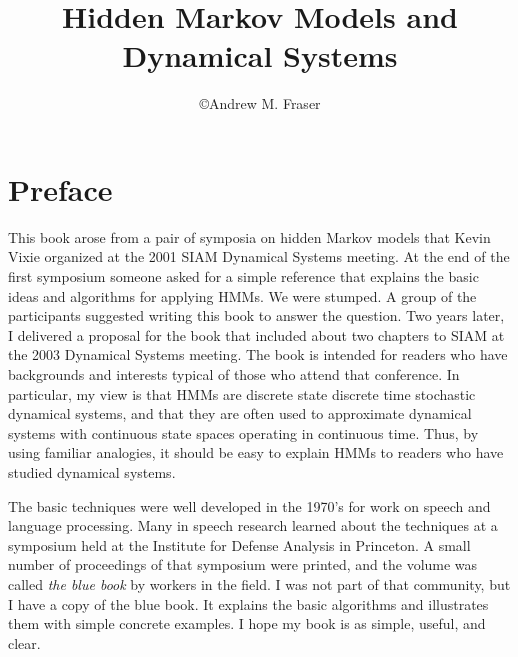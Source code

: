 \documentclass[dvips]{hmmdsbook}
\author{\copyright Andrew M. Fraser}
\title{Hidden Markov Models and Dynamical Systems}
\begin{document}
\frontmatter
\maketitle

\chapter*{Preface}
\label{chap:preface}
This book arose from a pair of symposia on hidden Markov models that
Kevin Vixie organized at the 2001 SIAM Dynamical Systems meeting.  At
the end of the first symposium someone asked for a simple reference
that explains the basic ideas and algorithms for applying HMMs.  We
were stumped.  A group of the participants suggested writing this book
to answer the question.  Two years later, I delivered a proposal for
the book that included about two chapters to SIAM at the 2003
Dynamical Systems meeting.  The book is intended for readers who have
backgrounds and interests typical of those who attend that conference.
In particular, my view is that HMMs are discrete state discrete time
stochastic dynamical systems, and that they are often used to
approximate dynamical systems with continuous state spaces operating
in continuous time.  Thus, by using familiar analogies, it should be
easy to explain HMMs to readers who have studied dynamical systems.

The basic techniques were well developed in the 1970's for work on
speech and language processing.  Many in speech research learned about
the techniques at a symposium held at the Institute for Defense
Analysis  in Princeton.  A small
number of proceedings of that symposium \cite{ida80} were printed, and
the volume was called \emph{the blue book} by workers in the field.  I
was not part of that community, but I have a copy of the blue book.
It explains the basic algorithms and illustrates them with simple
concrete examples.  I hope my book is as simple, useful, and clear.

\end{document}
